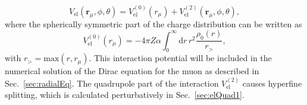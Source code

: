 \begin{equation}
\label{eq:quadInt}
V_{\text{el}}(\mathbf{r}_\mu,\phi,\theta) = V^{(0)}_{\text{el}}(r_\mu) + V^{(2)}_{\text{el}}(\mathbf{r}_\mu,\phi,\theta),
\end{equation}
where the spherically symmetric part of the charge distribution can be written as
\begin{equation}
\label{eq:Hmonopole}
V^{(0)}_{\text{el}}(r_\mu)= - 4 \pi Z\alpha \int_0^\infty \mathrm{d}r \, r^2 \frac{\rho_0(r)}{r_>},
\end{equation}
with $r_>=\text{max}(r,r_\mu)$. This interaction potential will be included in the numerical solution of the Dirac equation for the muon as described in Sec.~\ref{sec:radialEq}. The quadrupole part of the interaction $V^{(2)}_{\text{el}}$ causes hyperfine splitting, which is calculated perturbatively in Sec.~\ref{sec:elQuad1}.\\

